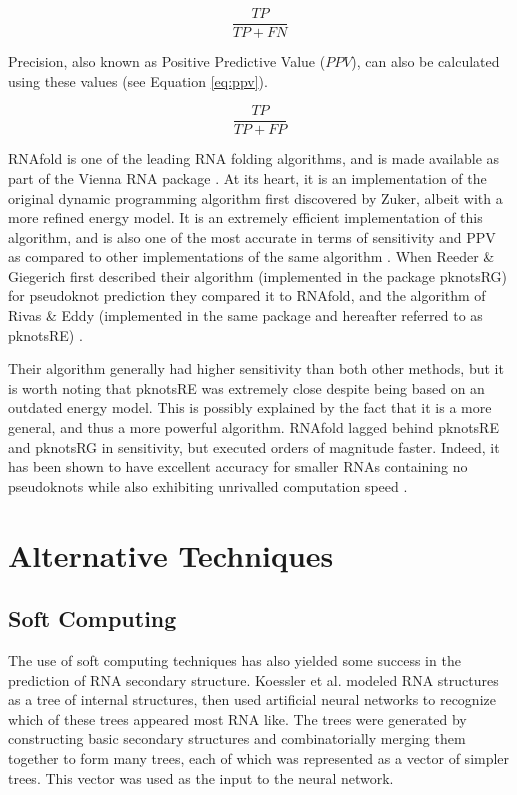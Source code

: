 \documentclass{cshonours}
\begin{document}
\begin{equation} \label{eq:tpr}
 \frac{TP}{TP + FN}
\end{equation}

Precision, also known as Positive Predictive Value ($PPV$), can also be calculated
using these values (see Equation \ref{eq:ppv}).


\begin{equation} \label{eq:ppv}
 \frac{TP}{TP + FP}
\end{equation}

RNAfold is one of the leading RNA folding algorithms, and is made available
as part of the Vienna RNA package \cite{lorenz2011viennarna}. At its heart, it is an implementation
of the original dynamic programming algorithm first discovered by Zuker, albeit
with a more refined energy model. It is an extremely efficient implementation of
this algorithm, and is also one of the most accurate in terms of sensitivity and
PPV as compared to other implementations of the same algorithm \cite{lorenz2011viennarna}. When
Reeder \& Giegerich \cite{reeder2004design} first described their algorithm (implemented in the package pknotsRG) for pseudoknot prediction they compared it to RNAfold, and the
algorithm of Rivas \& Eddy (implemented in the same package and hereafter
referred to as pknotsRE) \cite{rivas1999dynamic}. 

Their algorithm generally had higher sensitivity than
both other methods, but it is worth noting that pknotsRE was extremely close
despite being based on an outdated energy model. This is possibly explained by
the fact that it is a more general, and thus a more powerful algorithm. RNAfold
lagged behind pknotsRE and pknotsRG in sensitivity, but executed orders of magnitude faster. Indeed, it has been shown to have excellent accuracy for smaller RNAs containing
no pseudoknots while also exhibiting unrivalled computation speed \cite{lorenz2011viennarna}.


\section{Alternative Techniques}


\subsection{Soft Computing}
The use of soft computing techniques has also yielded some success in the prediction of RNA secondary structure. Koessler et al. \cite{koessler2010predictive} modeled RNA structures
as a tree of internal structures, then used artificial neural networks to recognize
which of these trees appeared most RNA like. The trees were generated by constructing basic secondary structures and combinatorially merging them together
to form many trees, each of which was represented as a vector of simpler trees.
This vector was used as the input to the neural network. 
\end{document}

